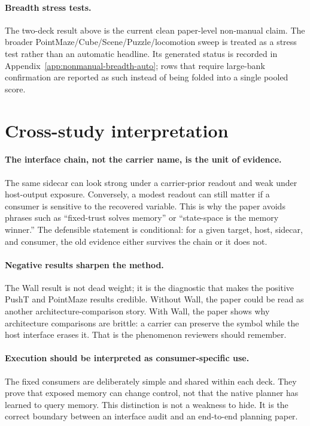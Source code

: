 \paragraph{Breadth stress tests.}
The two-deck result above is the current clean paper-level non-manual claim.
The broader PointMaze/Cube/Scene/Puzzle/locomotion sweep is treated as a
stress test rather than an automatic headline.  Its generated status is
recorded in Appendix~\ref{app:nonmanual-breadth-auto}; rows that require
large-bank confirmation are reported as such instead of being folded into a
single pooled score.

\section{Cross-study interpretation}

\paragraph{The interface chain, not the carrier name, is the unit of evidence.}
The same sidecar can look strong under a carrier-prior readout and weak under
host-output exposure.  Conversely, a modest readout can still matter if a
consumer is sensitive to the recovered variable.  This is why the paper avoids
phrases such as ``fixed-trust solves memory'' or ``state-space is the memory
winner.''  The defensible statement is conditional: for a given target, host,
sidecar, and consumer, the old evidence either survives the chain or it does
not.

\paragraph{Negative results sharpen the method.}
The Wall result is not dead weight; it is the diagnostic that makes the
positive PushT and PointMaze results credible.  Without Wall, the paper could
be read as another architecture-comparison story.  With Wall, the paper shows
why architecture comparisons are brittle: a carrier can preserve the symbol
while the host interface erases it.  That is the phenomenon reviewers should
remember.

\paragraph{Execution should be interpreted as consumer-specific use.}
The fixed consumers are deliberately simple and shared within each deck.  They
prove that exposed memory can change control, not that the native planner has
learned to query memory.  This distinction is not a weakness to hide.  It is
the correct boundary between an interface audit and an end-to-end planning
paper.

